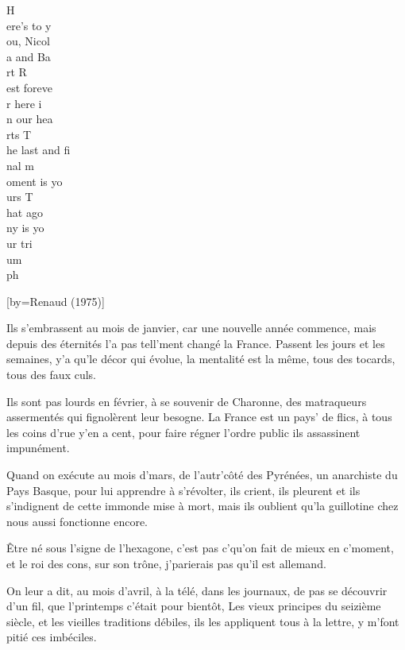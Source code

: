 \beginverse
H\\[Do]ere's to y\\[Sol]ou, Nicol\\[Lam]a and Ba\\[Mim]rt
R\\[do]est foreve\\[Sol]r here i\\[lam]n our hea\\[sol]rts
T\\[Mim]he last and fi\\[Rém]nal m\\[Sol]oment is yo\\[Do]urs
T\\[Do]hat ago\\[Sol]ny is yo\\[Lam]ur tri\\[Mim]um\\[Lam]ph
\\[8x]
\endverse

[by={Renaud (1975)}]

\beginverse
Ils s'embrassent au mois de janvier,
car une nouvelle année commence,
mais depuis des éternités
l'a pas tell'ment changé la France.
Passent les jours et les semaines,
y'a qu'le décor qui évolue,
la mentalité est la même,
tous des tocards, tous des faux culs.
\endverse

\beginverse
Ils sont pas lourds en février,
à se souvenir de Charonne,
des matraqueurs assermentés
qui fignolèrent leur besogne.
La France est un pays' de flics,
à tous les coins d'rue y'en a cent,
pour faire régner l'ordre public
ils assassinent impunément.
\endverse

\beginverse
Quand on exécute au mois d'mars,
de l'autr'côté des Pyrénées,
un anarchiste du Pays Basque,
pour lui apprendre à s'révolter,
ils crient, ils pleurent et ils s'indignent
de cette immonde mise à mort,
mais ils oublient qu'la guillotine
chez nous aussi fonctionne encore.
\endverse

\beginverse
Être né sous l'signe de l'hexagone,
c'est pas c'qu'on fait de mieux en c'moment,
et le roi des cons, sur son trône,
j'parierais pas qu'il est allemand.
\endverse

\beginverse
On leur a dit, au mois d'avril,
à la télé, dans les journaux,
de pas se découvrir d'un fil,
que l'printemps c'était pour bientôt,
Les vieux principes du seizième siècle,
et les vieilles traditions débiles,
ils les appliquent tous à la lettre,
y m'font pitié ces imbéciles.
\endverse

